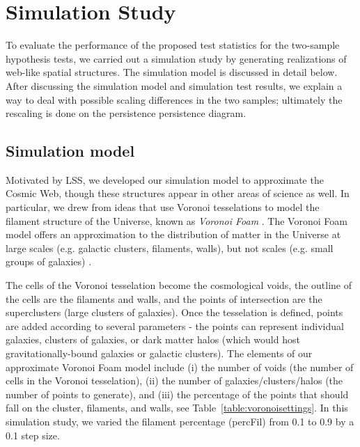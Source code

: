 \documentclass[12pt]{article}
\begin{document}

\section{Simulation Study}
\label{sec:simulation}

To evaluate the performance of the proposed test statistics for the two-sample hypothesis tests, we carried out a simulation study by generating realizations of web-like spatial structures.  The simulation model is discussed in detail below.  After discussing the simulation model and simulation test results, we explain a way to deal with possible scaling differences in the two samples; ultimately the rescaling is done on the persistence persistence diagram.

\subsection{Simulation model} \label{sec:sim_model} %
Motivated by LSS, we developed our simulation model to approximate the Cosmic Web, though these structures appear in other areas of science as well.  In particular, we drew from ideas that use Voronoi tesselations to model the filament structure of the Universe, known as \emph{Voronoi Foam} \cite{icke1987fragmenting, icke1991galaxy, van2007voronoi}.  The Voronoi Foam model offers an approximation to the distribution of matter in the Universe at large scales (e.g. galactic clusters, filaments, walls), but not scales (e.g. small groups of galaxies) \cite{icke1991galaxy}.

The cells of the Voronoi tesselation become the cosmological voids, the outline of the cells are the filaments and walls, and the points of intersection are the superclusters (large clusters of galaxies).  Once the tesselation is defined, points are added according to several parameters - the points can represent individual galaxies, clusters of galaxies, or dark matter halos (which would host gravitationally-bound galaxies or galactic clusters).
The elements of our approximate Voronoi Foam model include (i) the number of voids (the number of cells in the Voronoi tesselation), (ii) the number of galaxies/clusters/halos (the number of points to generate), and (iii) the percentage of the points that should fall on the cluster, filaments, and walls, see Table~\ref{table:voronoisettings}.   
In this simulation study, we varied the filament percentage (percFil) from 0.1 to 0.9 by a 0.1 step size.  
\end{document}
